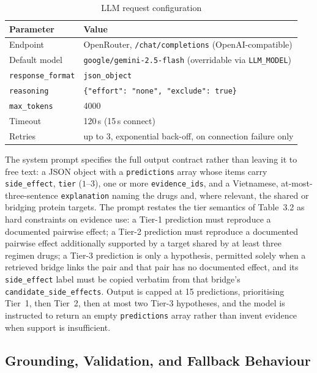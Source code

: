 \documentclass[11pt]{report}
\begin{document}
\begin{table}[t]
  \caption{LLM request configuration}
  \label{tab:llm}
  \centering
  \begin{tabular}{@{}ll@{}}
    \toprule
    Parameter & Value \\
    \midrule
    Endpoint         & OpenRouter, \texttt{/chat/completions} (OpenAI-compatible) \\
    Default model    & \texttt{google/gemini-2.5-flash} (overridable via \texttt{LLM\_MODEL}) \\
    \texttt{response\_format} & \texttt{json\_object} \\
    \texttt{reasoning}        & \texttt{\{"effort": "none", "exclude": true\}} \\
    \texttt{max\_tokens}      & 4000 \\
    Timeout          & 120\,s (15\,s connect) \\
    Retries          & up to 3, exponential back-off, on connection failure only \\
    \bottomrule
  \end{tabular}
\end{table}

The system prompt specifies the full output contract rather than leaving it
to free text: a JSON object with a \texttt{predictions} array whose items
carry \texttt{side\_effect}, \texttt{tier} ($1$--$3$), one or more
\texttt{evidence\_ids}, and a Vietnamese, at-most-three-sentence
\texttt{explanation} naming the drugs and, where relevant, the shared or
bridging protein targets. The prompt restates the tier semantics of
Table~3.2 as hard constraints on evidence use: a Tier-1 prediction must
reproduce a documented pairwise effect; a Tier-2 prediction must reproduce a
documented pairwise effect additionally supported by a target shared by at
least three regimen drugs; a Tier-3 prediction is only a hypothesis,
permitted solely when a retrieved bridge links the pair and that pair has
no documented effect, and its \texttt{side\_effect} label must be copied
verbatim from that bridge's \texttt{candidate\_side\_effects}. Output is
capped at 15 predictions, prioritising Tier~1, then Tier~2, then at most two
Tier-3 hypotheses, and the model is instructed to return an empty
\texttt{predictions} array rather than invent evidence when support is
insufficient.

\subsection{Grounding, Validation, and Fallback Behaviour}
\label{sec:grounding}
\end{document}
